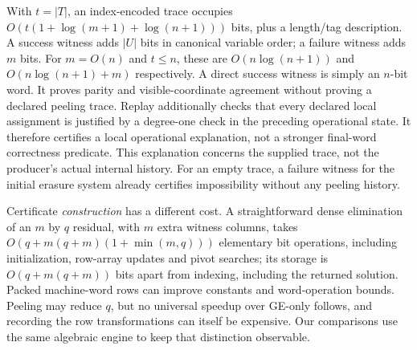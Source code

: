 With $t=|T|$, an index-encoded trace occupies
$O(t(1+\log(m+1)+\log(n+1)))$ bits, plus a length/tag description.
A success witness adds $|U|$ bits in canonical variable order; a
failure witness adds $m$ bits. For $m=O(n)$ and $t\leq n$, these are
$O(n\log(n+1))$ and $O(n\log(n+1)+m)$ respectively.
A direct success witness is simply an $n$-bit word. It proves parity
and visible-coordinate agreement without proving a declared peeling
trace. Replay additionally checks that every declared local assignment
is justified by a degree-one check in the preceding operational state.
It therefore certifies a local operational explanation, not a stronger
final-word correctness predicate. This explanation concerns the supplied
trace, not the producer's actual internal history. For an
empty trace, a failure witness for the initial erasure system already
certifies impossibility without any peeling history.

Certificate \emph{construction} has a different cost. A straightforward
dense elimination of an $m$ by $q$ residual, with $m$ extra witness
columns, takes $O(q+m(q+m)(1+\min(m,q)))$ elementary bit operations,
including initialization, row-array updates and pivot searches; its storage is
$O(q+m(q+m))$ bits apart from indexing, including the returned solution. Packed machine-word rows can
improve constants and word-operation bounds. Peeling may reduce $q$,
but no universal speedup over GE-only follows, and recording the
row transformations can itself be expensive. Our comparisons use
the same algebraic engine to keep that distinction observable.
